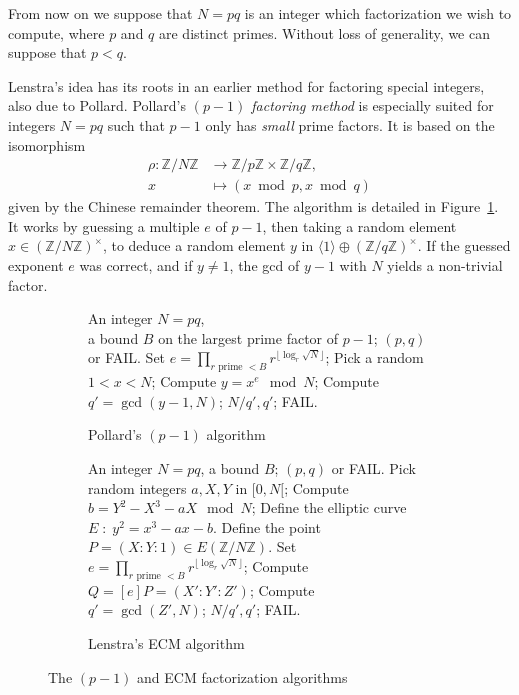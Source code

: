 \documentclass[10pt]{article}
\theoremstyle{plain}
\theoremstyle{definition}
\begin{document}
From now on we suppose that $N=pq$ is an integer which factorization
we wish to compute, where $p$ and $q$ are distinct primes. %
Without loss of generality, we can suppose that $p<q$.

Lenstra's idea has its roots in an earlier method for factoring
special integers, also due to Pollard. %
Pollard's \emph{$(p-1)$ factoring method} is especially suited for
integers $N=pq$ such that $p-1$ only has \emph{small} prime factors. %
It is based on the isomorphism
\begin{align*}
  \rho : ℤ/Nℤ &\to ℤ/pℤ × ℤ/qℤ,\\
  x &\mapsto (x \bmod p, x \bmod q)
\end{align*}
given by the Chinese remainder theorem. %
The algorithm is detailed in Figure~\ref{fig:p-1}. %
It works by guessing a multiple $e$ of $p-1$, then taking a random
element $x∈(ℤ/Nℤ)^{×}$, to deduce a random element $y$ in
$〈1〉⊕(ℤ/qℤ)^{×}$. If the guessed exponent $e$ was correct, and if
$y≠1$, the gcd of $y-1$ with $N$ yields a non-trivial factor. %

\begin{figure}
  \begin{subfigure}{0.45\textwidth}
    \begin{algorithmic}[1]
      \REQUIRE An integer $N=pq$,\\
      a bound $B$ on the largest prime factor of $p-1$;
      \ENSURE $(p,q)$ or FAIL.
      \STATE Set $e = \prod_{r \text{ prime } < B} r^{\lfloor\log_r\sqrt{N}\rfloor}$;
      \STATE Pick a random $1 < x < N$;
      \STATE Compute $y = x^e \mod N$;
      \STATE Compute $q' = \gcd(y-1, N)$;
      \RETURN $N/q', q'$;
      \ELSE
      \RETURN FAIL.
      \ENDIF
    \end{algorithmic}
    
    \caption{Pollard's $(p-1)$ algorithm}
    \label{fig:p-1}
  \end{subfigure}
  \hfill
  \begin{subfigure}{0.45\textwidth}
    \begin{algorithmic}[1]
      \REQUIRE An integer $N=pq$, a bound $B$;
      \ENSURE $(p,q)$ or FAIL.
      \STATE Pick random integers $a,X,Y$ in $[0,N[$;
      \STATE Compute $b = Y^2 - X^3 - aX \mod N$;
      \STATE Define the elliptic curve $E \;:\; y^2 = x^3 - ax - b$.
      \STATE Define the point $P=(X:Y:1) ∈ E(ℤ/Nℤ)$.
      \STATE Set $e = \prod_{r \text{ prime } < B} r^{\lfloor\log_r\sqrt{N}\rfloor}$;
      \STATE Compute $Q = [e]P = (X':Y':Z')$;
      \STATE Compute $q' = \gcd(Z', N)$;
      \RETURN $N/q', q'$;
      \ELSE
      \RETURN FAIL.
      \ENDIF
    \end{algorithmic}
    
    \caption{Lenstra's ECM algorithm}
    \label{fig:ecm}
  \end{subfigure}
  \caption{The $(p-1)$ and ECM factorization algorithms}
\end{figure}
\end{document}
